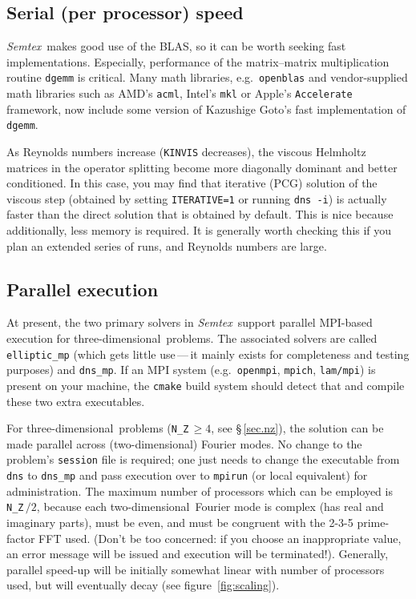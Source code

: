 \documentclass[11pt]{report}
\newcommand{\Semtex}{\emph{Semtex}} \newcommand{\Dog}{\emph{Dog}}
\newcommand\twod{two-di\-men\-sion\-al}
\newcommand\threed{three-di\-men\-sion\-al}
\newcommand{\eg}{e.g.\ } \newcommand{\CC}{\mathrm{c.c.}}
\begin{document}
\subsection{Serial (per processor) speed}

\Semtex\ makes good use of the BLAS, so it can be worth seeking fast
implementations. Especially, performance of the matrix--matrix
multiplication routine \verb+dgemm+ is critical. Many math libraries,
\eg \verb|openblas| and vendor-supplied math libraries such as AMD's
\verb|acml|, Intel's \verb|mkl| or Apple's \verb|Accelerate|
framework, now include some version of Kazushige Goto's fast
implementation of \verb|dgemm|.

As Reynolds numbers increase (\ie \verb+KINVIS+ decreases), the
viscous Helmholtz matrices in the operator splitting become more
diagonally dominant and better conditioned. In this case, you may find
that iterative (PCG) solution of the viscous step (obtained by setting
\verb|ITERATIVE=1| or running \verb|dns -i|) is actually faster than
the direct solution that is obtained by default. This is nice because
additionally, less memory is required. It is generally worth checking
this if you plan an extended series of runs, and Reynolds numbers are
large.

\subsection{Parallel execution}
\label{sec.mpi}

At present, the two primary solvers in \Semtex\ support parallel
MPI-based execution for \threed\ problems.  The associated solvers are
called \verb|elliptic_mp| (which gets little use\,---\,it mainly
exists for completeness and testing purposes) and \verb|dns_mp|.  If
an MPI system (\eg \verb|openmpi|, \verb|mpich|, \verb|lam/mpi|) is
present on your machine, the \verb|cmake| build system should detect
that and compile these two extra executables.

For \threed\ problems (\verb|N_Z|\,$\ge4$, see \S\,\ref{sec.nz}), the
solution can be made parallel across (\twod) Fourier modes.  No change
to the problem's \verb|session| file is required; one just needs to
change the executable from \verb|dns| to \verb|dns_mp| and pass
execution over to \verb|mpirun| (or local equivalent) for
administration.  The maximum number of processors which can be
employed is \verb|N_Z|\,$/2$, because each \twod\ Fourier mode is
complex (has real and imaginary parts), must be even, and must be
congruent with the 2-3-5 prime-factor FFT used.  (Don't be too
concerned: if you choose an inappropriate value, an error message will
be issued and execution will be terminated!).  Generally, parallel
speed-up will be initially somewhat linear with number of processors
used, but will eventually decay (see figure~\ref{fig:scaling}).
\end{document}
